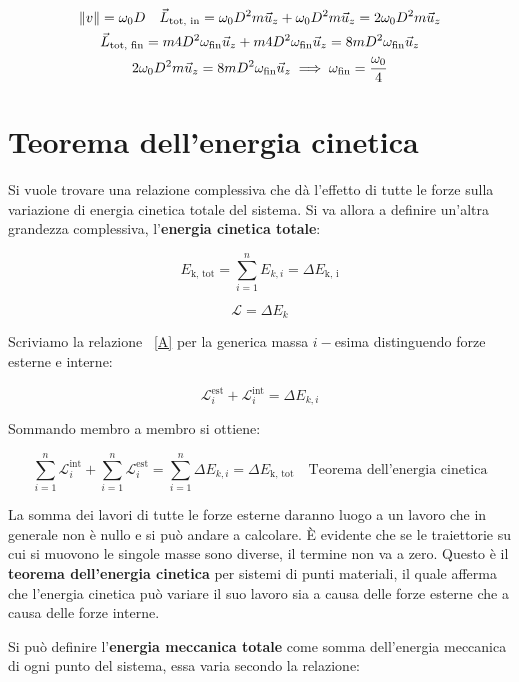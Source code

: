 \begin{gather*}
	\lVert v\rVert=\omega_0 D \quad \vec{L}_\text{tot, in}=\omega_0 D^2m\vec{u}_z+\omega_0 D^2m\vec{u}_z=2\omega_0 D^2m\vec{u}_z \\
	\vec{L}_\text{tot, fin}=m4D^2\omega_\text{fin}\vec{u}_z+m4D^2\omega_\text{fin}\vec{u}_z=8mD^2\omega_\text{fin}\vec{u}_z \\
	2\omega_0 D^2m\vec{u}_z= 8mD^2\omega_\text{fin}\vec{u}_z \implies \omega_\text{fin}=\frac{\omega_0}{4}
\end{gather*}

\section{Teorema dell'energia cinetica}

Si vuole trovare una relazione complessiva che dà l'effetto di tutte le forze sulla variazione di energia cinetica totale del sistema. Si va allora a definire un'altra grandezza complessiva, l'\textbf{energia cinetica totale}:

\[
	E_\text{k, tot}=\sum_{i=1}^nE_{k, i}=\Delta E_\text{k, i}
\]

\begin{equation}
	\label{A}
	\mathcal{L}=\Delta E_k
\end{equation}

Scriviamo la relazione ~\eqref{A} per la generica massa $i-$esima distinguendo forze esterne e interne:

\[
	\mathcal{L}_i^\text{est}+\mathcal{L}_i^\text{int}=\Delta E_{k, i}
\]

Sommando membro a membro si ottiene:

\[
	\boxed{\sum_{i=1}^n \mathcal{L}_i^\text{int}+\sum_{i=1}^n\mathcal{L}_i^\text{est}=\sum_{i=1}^n \Delta E_{k, i}= \Delta E_\text{k, tot}  \quad \text{Teorema dell'energia cinetica}}
\]

La somma dei lavori di tutte le forze esterne daranno luogo a un lavoro che in generale non è nullo e si può andare a calcolare. È evidente che se le traiettorie su cui si muovono le singole masse sono diverse, il termine non va a zero. Questo è il \textbf{teorema dell'energia cinetica} per sistemi di punti materiali, il quale afferma che l'energia cinetica può variare il suo lavoro sia a causa delle forze esterne che a causa delle forze interne.

Si può definire l'\textbf{energia meccanica totale} come somma dell'energia meccanica di ogni punto del sistema, essa varia secondo la relazione:

